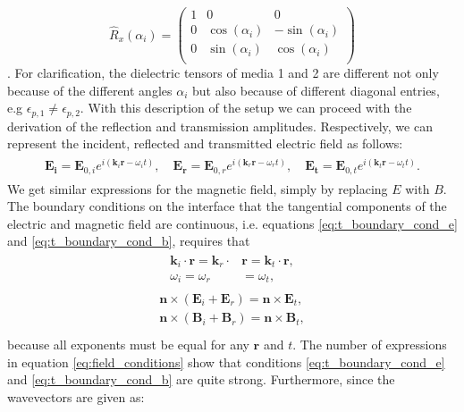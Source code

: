 \begin{equation}
    \label{eq:x_rotation_matrix}
    \hat{R}_x(\alpha_i) = 
    \begin{pmatrix}
        1 & 0 & 0 \\
        0 & \cos (\alpha_i) & -\sin (\alpha_i) \\
        0 & \sin (\alpha_i) & \cos (\alpha_i) \\
    \end{pmatrix}
\end{equation}
\cite{J.Muthsam2006LineareAnwendungen}.
For clarification, the dielectric tensors of media 1 and 2 are different not only because of the different angles $\alpha_i$ but also because of different diagonal entries, e.g $\epsilon_{p,1} \neq \epsilon_{p,2}$. With this description of the setup we can proceed with the derivation of the reflection and transmission amplitudes. Respectively, we can represent the incident, reflected and transmitted electric field as follows:
\begin{align}
\begin{split}
    \bm{E_i} = \bm{E}_{0,i}e^{i(\bm{k}_i\bm{r}-\omega_i t)},
    \quad
    \bm{E_r} = \bm{E}_{0,r}e^{i(\bm{k}_r\bm{r}-\omega_r t)},
    \quad
    \bm{E_t} = \bm{E}_{0,t}e^{i(\bm{k}_t\bm{r}-\omega_t t)}.
\end{split}
\end{align}
We get similar expressions for the magnetic field, simply by replacing $E$ with $B$. 
The boundary conditions on the interface that the tangential components of the electric and magnetic field are continuous, i.e. equations \ref{eq:t_boundary_cond_e} and \ref{eq:t_boundary_cond_b}, requires that
\begin{align}
\begin{split}
    \label{eq:field_conditions}
    \bm{k}_i \cdot \bm{r} = \bm{k}_r \cdot& \bm{r} = \bm{k}_t \cdot \bm{r}, \\
    \omega_i = \omega_r& = \omega_t,
\end{split}
\end{align}
\begin{align}
\begin{split}
    \label{eq:interface_amplitudes}
    \bm{n} \times (\bm{E}_{i} + \bm{E}_{r}) = \bm{n} \times \bm{E}_{t}, \\
    \bm{n} \times (\bm{B}_{i} + \bm{B}_{r}) = \bm{n} \times \bm{B}_{t}, \\
\end{split}
\end{align}
because all exponents must be equal for any $\bm{r}$ and $t$. The number of expressions in equation \ref{eq:field_conditions} show that conditions \ref{eq:t_boundary_cond_e} and \ref{eq:t_boundary_cond_b} are quite strong. Furthermore, since the wavevectors are given as:
